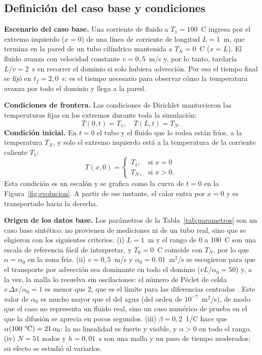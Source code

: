 \documentclass[final,5p,times,twocolumn,authoryear,11pt]{elsarticle}
\begin{document}
\subsection{Definición del caso base y condiciones}

\textbf{Escenario del caso base.} Una corriente de fluido a $T_1=100$~\textdegree C ingresa por el extremo izquierdo ($x=0$) de una línea de corriente de longitud $L=1$~m, que termina en la pared de un tubo cilíndrico mantenida a $T_N=0$~\textdegree C ($x=L$). El fluido avanza con velocidad constante $v=0{,}5$~m/s y, por lo tanto, tardaría $L/v=2$~s en recorrer el dominio si solo hubiera advección. Por eso el tiempo final se fijó en $t_f=2{,}0$~s: es el tiempo necesario para observar cómo la temperatura avanza por todo el dominio y llega a la pared.

\textbf{Condiciones de frontera.} Las condiciones de Dirichlet mantuvieron las temperaturas fijas en los extremos durante toda la simulación:
\begin{equation}
T(0,t) = T_1, \quad T(L,t) = T_N.
\end{equation}
\textbf{Condición inicial.} En $t=0$ el tubo y el fluido que lo rodea están fríos, a la temperatura $T_N$, y solo el extremo izquierdo está a la temperatura de la corriente caliente $T_1$:
\begin{equation}
T(x,0) = \begin{cases}
T_1, & \text{si } x = 0 \\
T_N, & \text{si } x > 0.
\end{cases}
\end{equation}
Esta condición es un escalón y se grafica como la curva de $t=0$ en la Figura~\ref{fig:evolucion}. A partir de ese instante, el calor entra por $x=0$ y es transportado hacia la derecha.

\textbf{Origen de los datos base.} Los parámetros de la Tabla~\ref{tab:parametros} son un caso base sintético: no provienen de mediciones ni de un tubo real, sino que se eligieron con los siguientes criterios. (i) $L=1$~m y el rango de 0 a 100~\textdegree C son una escala de referencia fácil de interpretar, y $T_0=0$~\textdegree C coincide con $T_N$, por lo que $\alpha=\alpha_0$ en la zona fría. (ii) $v=0{,}5$~m/s y $\alpha_0=0{,}01$~m$^2$/s se escogieron para que el transporte por advección sea dominante en todo el dominio ($vL/\alpha_0=50$) y, a la vez, la malla lo resuelva sin oscilaciones: el número de Péclet de celda $v\,\Delta x/\alpha_0=1$ es menor que 2, que es el límite para las diferencias centradas \citep{Gresho1981}. Este valor de $\alpha_0$ es mucho mayor que el del agua (del orden de $10^{-7}$~m$^2$/s), de modo que el caso no representa un fluido real, sino un caso numérico de prueba en el que la difusión se aprecia en pocos segundos. (iii) $\beta=0{,}2$~1/\textdegree C hace que $\alpha(100~\text{\textdegree C})=21\,\alpha_0$: la no linealidad es fuerte y visible, y $\alpha>0$ en todo el rango. (iv) $N=51$ nodos y $h=0{,}01$~s son una malla y un paso de tiempo moderados; su efecto se estudió al variarlos.
\end{document}
